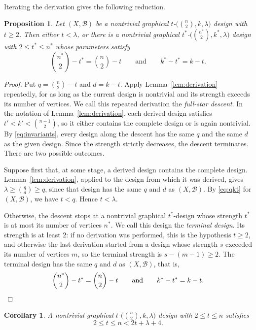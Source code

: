 \documentclass[12pt]{amsart}
\newtheorem{proposition}[theorem]{Proposition}
\newtheorem{corollary}[theorem]{Corollary}
\theoremstyle{definition}
\newcommand{\cB}{\mathcal{B}}
\begin{document}
Iterating the derivation gives the following reduction.

\begin{proposition}
\label{prop:descent}
Let $(X, \cB)$ be a nontrivial graphical $t$-$\bigl(\binom{n}{2}, k,
\lambda\bigr)$ design with $t \geq 2$. Then either $t < \lambda$, or there
is a nontrivial graphical $t^*$-$\bigl(\binom{n^*}{2}, k^*, \lambda\bigr)$
design with $2 \leq t^* \leq n^*$ whose parameters satisfy
\[
\binom{n^*}{2} - t^* = \binom{n}{2} - t
\qquad \text{and} \qquad
k^* - t^* = k - t.
\]
\end{proposition}

\begin{proof}
Put $q = \binom{n}{2} - t$ and $d = k - t$. Apply Lemma~\ref{lem:derivation}
repeatedly, for as long as the current design is nontrivial and its strength
exceeds its number of vertices. We call this repeated derivation the
\emph{full-star descent}. In the notation of Lemma~\ref{lem:derivation},
each derived design satisfies $t' < k' < \binom{n-1}{2}$, so it either
contains the complete design or is again nontrivial. By
\eqref{eq:invariants}, every design along the descent has the same $q$ and
the same $d$ as the given design. Since the strength strictly decreases, the
descent terminates. There are two possible outcomes.

Suppose first that, at some stage, a derived design contains the complete
design. Lemma~\ref{lem:derivation}, applied to the design from which it was
derived, gives $\lambda \geq \binom{q}{d} \geq q$, since that design has the
same $q$ and $d$ as $(X, \cB)$. By \eqref{eq:qkt} for $(X, \cB)$, we have $t
< q$. Hence $t < \lambda$.

Otherwise, the descent stops at a nontrivial graphical $t^*$-design whose
strength $t^*$ is at most its number of vertices $n^*$. We call this design
the \emph{terminal design}. Its strength is at least $2$: if no derivation
was performed, this is the hypothesis $t \geq 2$, and otherwise the last
derivation started from a design whose strength $s$ exceeded its number of
vertices $m$, so the terminal strength is $s - (m - 1) \geq 2$. The terminal
design has the same $q$ and $d$ as $(X, \cB)$, that is,
\[
\binom{n^*}{2} - t^* = \binom{n}{2} - t
\qquad \text{and} \qquad
k^* - t^* = k - t.
\qedhere
\]
\end{proof}

\begin{corollary}
\label{cor:range}
A nontrivial graphical $t$-$\bigl(\binom{n}{2}, k, \lambda\bigr)$ design
with $2 \leq t \leq n$ satisfies
\begin{equation}
\label{eq:range}
2 \leq t \leq n < 2t + \lambda + 4.
\end{equation}
\end{corollary}
\end{document}
